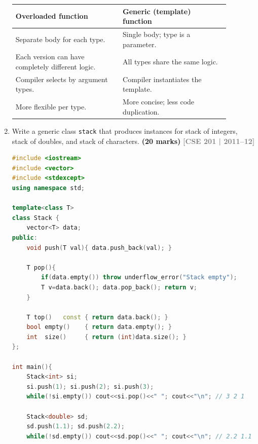 \documentclass[12pt,a3paper]{article}
\newcommand{\yr}[1]{\hfill\textcolor{gray}{\small\textbf{[#1]}}}
\newcommand{\mk}[1]{\textcolor{orange!70!black}{\small\textbf{(#1 marks)}}}
\begin{document}
\begin{enumerate}
\begin{tcolorbox}[enhanced,breakable,ansbox,colback=cH!4,colframe=cH,
  boxrule=0.8pt,arc=5pt,
  title={\textbf{Answer --- Overloaded function vs generic function}},
  fonttitle=\bfseries\color{white},colbacktitle=cH]
\begin{center}
\small
\begin{tabular}{@{}p{0.44\linewidth}p{0.44\linewidth}@{}}
\toprule
\textbf{Overloaded function} & \textbf{Generic (template) function} \\
\midrule
Separate body for each type. &
Single body; type is a parameter. \\[3pt]
Each version can have completely different logic. &
All types share the same logic. \\[3pt]
Compiler selects by argument types. &
Compiler instantiates the template. \\[3pt]
More flexible per type. &
More concise; less code duplication. \\
\bottomrule
\end{tabular}
\end{center}

\end{tcolorbox}


\item Write a generic class \texttt{stack} that produces instances for stack of integers, stack of doubles, and stack of characters. \mk{20}
\yr{CSE 201 | 2011--12}
\begin{tcolorbox}[enhanced,breakable,ansbox,colback=cH!4,colframe=cH,
  boxrule=0.8pt,arc=5pt,
  title={\textbf{Answer --- Generic stack for int, double, char}},
  fonttitle=\bfseries\color{white},colbacktitle=cH]

\begin{lstlisting}[language=C++]
#include <iostream>
#include <vector>
#include <stdexcept>
using namespace std;

template<class T>
class Stack {
    vector<T> data;
public:
    void push(T val){ data.push_back(val); }

    T pop(){
        if(data.empty()) throw underflow_error("Stack empty");
        T v=data.back(); data.pop_back(); return v;
    }

    T top()   const { return data.back(); }
    bool empty()    { return data.empty(); }
    int  size()     { return (int)data.size(); }
};

int main(){
    Stack<int> si;
    si.push(1); si.push(2); si.push(3);
    while(!si.empty()) cout<<si.pop()<<" "; cout<<"\n"; // 3 2 1

    Stack<double> sd;
    sd.push(1.1); sd.push(2.2);
    while(!sd.empty()) cout<<sd.pop()<<" "; cout<<"\n"; // 2.2 1.1


\end{lstlisting}
\end{tcolorbox}
\end{enumerate}
\end{document}
